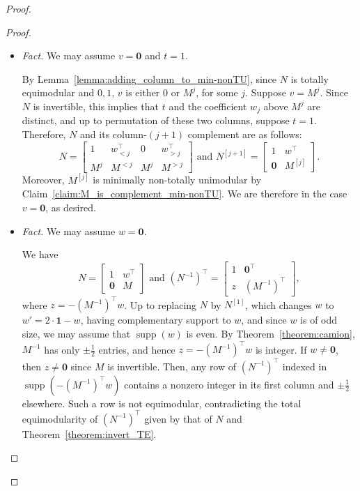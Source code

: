 \documentclass[11pt,a4paper]{amsart}
\theoremstyle{plain}
\theoremstyle{definition}
\DeclareMathOperator{\supp}{supp}
\begin{document}
\begin{proof}
\begin{proof}
\begin{itemize}
	\item[] \hspace{-.5cm} {\em Fact. } We may assume $v=\mathbf{0}$ and $t=1$.
	
	\medskip
	
	By Lemma~\ref{lemma:adding_column_to_min-nonTU}, since $N$ is totally equimodular and $0,\!1$, $v$ is either $0$ or $M^j$, for some $j$.
	Suppose $v=M^j$.
	Since $N$ is invertible, this implies that $t$ and the coefficient $w_j$ above $M^j$ are distinct, and up to permutation of these two columns, suppose $t=1$.
	Therefore, $N$ and its column-$(j+1)$ complement are as follows:
	$$N = \begin{bmatrix}
		1& w_{<j}^\top & 0 & w_{>j}^\top \\
		M^j & M^{<j} & M^j & M^{>j}
	\end{bmatrix} \text{ and } N^{[j+1]} = \begin{bmatrix}
		1& w^\top \\
		\mathbf{0} & M^{[j]}
	\end{bmatrix}.$$
	Moreover, $M^{[j]}$ is minimally non-totally unimodular by Claim~\ref{claim:M_is_complement_min-nonTU}.
	We are therefore in the case $v=\mathbf{0}$, as desired.
	
	\medskip
	
	\item[] \hspace{-.5cm}  {\em Fact. } We may assume $w=\mathbf{0}$.
	
	\medskip
	
	We have
	$$N = \begin{bmatrix}
		1&  w^\top\\
		\mathbf{0} & M
	\end{bmatrix} \text{ and } (N^{-1})^\top = \begin{bmatrix}
		1&  \mathbf{0}^\top\\
		z & (M^{-1})^\top
	\end{bmatrix},$$
	where $z=- (M^{-1})^\top w$.
	Up to replacing $N$ by $N^{[1]}$, which changes $w$ to $w' = 2\cdot\mathbf{1} - w$, having complementary support to $w$, and since $w$ is of odd size, we may assume that $\supp(w)$ is even. 
	By Theorem~\ref{theorem:camion}, $M^{-1}$ has only $\pm \frac{1}{2}$ entries, and hence $z=-(M^{-1})^\top w$ is integer.
	If $w\neq \mathbf{0}$, then $z\neq \mathbf{0}$ since $M$ is invertible.
	Then, any row of $(N^{-1})^\top$ indexed in  $\supp(-(M^{-1})^\top w)$ contains a nonzero integer in its first column and $\pm \frac12$ elsewhere. Such a row is not equimodular, contradicting the total equimodularity of $(N^{-1})^\top$ given by that of $N$ and Theorem~\ref{theorem:invert_TE}.
\end{itemize}


\end{proof}
\end{proof}
\end{document}
